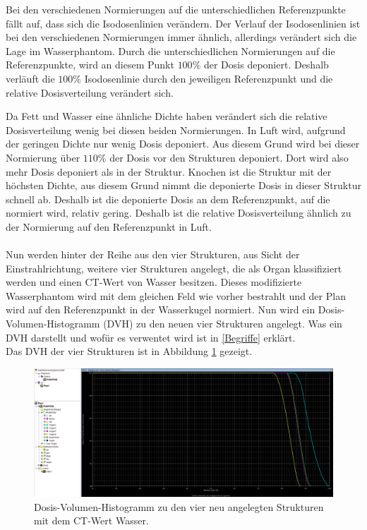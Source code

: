 Bei den verschiedenen Normierungen auf die unterschiedlichen Referenzpunkte
fällt auf, dass sich die Isodosenlinien verändern. Der Verlauf der
Isodosenlinien ist bei den verschiedenen Normierungen immer ähnlich,
allerdings verändert sich die Lage im Wasserphantom.
Durch die unterschiedlichen Normierungen auf die Referenzpunkte, wird an
diesem Punkt $100\%$ der Dosis deponiert. Deshalb verläuft
die $100\%$ Isodosenlinie durch den jeweiligen Referenzpunkt und
die relative Dosisverteilung verändert sich.

Da Fett und Wasser eine ähnliche Dichte haben verändert sich die relative
Dosisverteilung wenig bei diesen beiden Normierungen.
In Luft wird, aufgrund der geringen Dichte nur wenig Dosis deponiert.
Aus diesem Grund wird bei dieser Normierung über $110\%$ der Dosis vor
den Strukturen deponiert. Dort wird also mehr Dosis deponiert als in
der Struktur.
Knochen ist die Struktur mit der höchsten Dichte, aus diesem Grund nimmt
die deponierte Dosis in dieser Struktur schnell ab. Deshalb ist die deponierte
Dosis an dem Referenzpunkt, auf die normiert wird, relativ gering.
Deshalb ist die relative Dosisverteilung ähnlich zu der Normierung auf den
Referenzpunkt in Luft. \\\\


Nun werden hinter der Reihe aus den vier Strukturen, aus Sicht der
Einstrahlrichtung, weitere vier Strukturen angelegt, die als Organ
klassifiziert werden und einen CT-Wert von Wasser besitzen.
Dieses modifizierte Wasserphantom wird mit dem gleichen Feld wie vorher
bestrahlt und der Plan wird auf den Referenzpunkt in der Wasserkugel
normiert. Nun wird ein Dosis-Volumen-Histogramm (DVH) zu den neuen vier Strukturen
angelegt. Was ein DVH darstellt und wofür es verwentet wird ist in \ref{Begriffe}
erklärt.\\
Das DVH der vier Strukturen ist in Abbildung \ref{abb:3.1_8} gezeigt.

\begin{figure}[H]
  \centering
  \includegraphics[width=\textwidth]{../../Wasserphantom Bilder/Aufgabe3.1_8.png}
  \caption{Dosis-Volumen-Histogramm zu den vier neu angelegten Strukturen mit dem CT-Wert Wasser.}
  \label{abb:3.1_8}
\end{figure}

